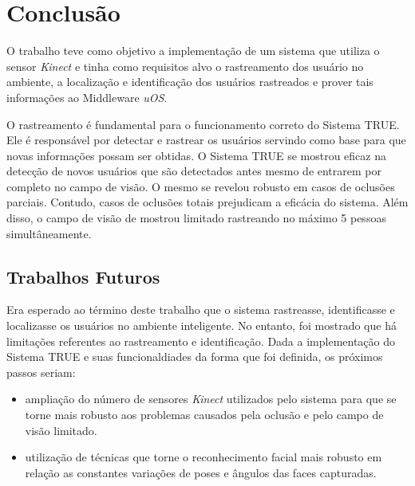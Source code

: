 \chapter{Conclusão}
\label{cap:conclusao}

O trabalho teve como objetivo a implementação de um sistema que utiliza o sensor \textit{Kinect} e tinha como requisitos alvo o rastreamento dos usuário no ambiente, a localização e identificação dos usuários rastreados e prover tais informações ao Middleware \textit{uOS}.

O rastreamento é fundamental para o funcionamento correto do Sistema TRUE. Ele é responsável por detectar e rastrear os usuários servindo como base para que novas informações possam ser obtidas. O Sistema TRUE se mostrou eficaz na detecção de novos usuários que são detectados antes mesmo de entrarem por completo no campo de visão. O mesmo se revelou robusto em casos de oclusões parciais. Contudo, casos de oclusões totais prejudicam a eficácia do sistema. Além disso, o campo de visão de mostrou limitado rastreando no máximo 5 pessoas simultâneamente.


\section{Trabalhos Futuros}

Era esperado ao término deste trabalho que o sistema rastreasse, identificasse e localizasse os usuários no ambiente inteligente. No entanto, foi mostrado que há limitações referentes ao rastreamento e identificação. Dada a implementação do Sistema TRUE e suas funcionaldiades da forma que foi definida, os próximos passos seriam:

\begin{itemize}
	\item ampliação do número de sensores \textit{Kinect} utilizados pelo sistema para que se torne mais robusto aos problemas causados pela oclusão e pelo campo de visão limitado.
	\item utilização de técnicas que torne o reconhecimento facial mais robusto em relação as constantes variações de poses e ângulos das faces capturadas.
\end{itemize}




